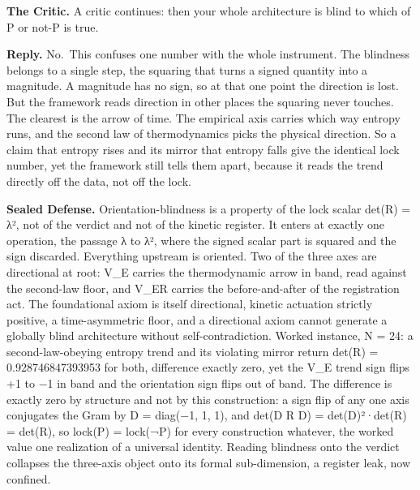\documentclass[10pt,twocolumn]{article}
\begin{document}
\textbf{The Critic.} A critic continues: then your whole architecture is
blind to which of P or not-P is true.

\textbf{Reply.} No.~This confuses one number with the whole instrument.
The blindness belongs to a single step, the squaring that turns a signed
quantity into a magnitude. A magnitude has no sign, so at that one point
the direction is lost. But the framework reads direction in other places
the squaring never touches. The clearest is the arrow of time. The
empirical axis carries which way entropy runs, and the second law of
thermodynamics picks the physical direction. So a claim that entropy
rises and its mirror that entropy falls give the identical lock number,
yet the framework still tells them apart, because it reads the trend
directly off the data, not off the lock.

\textbf{Sealed Defense.} Orientation-blindness is a property of the lock
scalar det(R) = λ², not of the verdict and not of the kinetic register.
It enters at exactly one operation, the passage λ to λ², where the
signed scalar part is squared and the sign discarded. Everything
upstream is oriented. Two of the three axes are directional at root:
V\_E carries the thermodynamic arrow in band, read against the
second-law floor, and V\_ER carries the before-and-after of the
registration act. The foundational axiom is itself directional, kinetic
actuation strictly positive, a time-asymmetric floor, and a directional
axiom cannot generate a globally blind architecture without
self-contradiction. Worked instance, N = 24: a second-law-obeying
entropy trend and its violating mirror return det(R) = 0.928746847393953
for both, difference exactly zero, yet the V\_E trend sign flips +1 to
−1 in band and the orientation sign flips out of band. The difference is
exactly zero by structure and not by this construction: a sign flip of
any one axis conjugates the Gram by D = diag(−1, 1, 1), and det(D R D) =
det(D)²·det(R) = det(R), so lock(P) = lock(¬P) for every construction
whatever, the worked value one realization of a universal identity.
Reading blindness onto the verdict collapses the three-axis object onto
its formal sub-dimension, a register leak, now confined.
\end{document}

